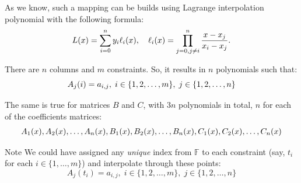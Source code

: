 \documentclass{zkdl-presentation-template}
\begin{document}
    \begin{frame}
        As we know, such a mapping can be builds using Lagrange interpolation polynomial with the
        following formula:
        \vspace{-10pt}
        \begin{equation*}
            L(x) = \sum_{i=0}^{n} y_i \ell_i(x), \quad \ell_i(x) = \prod_{j=0, j \neq i}^{n} \frac{x-x_j}{x_i-x_j}.
            \vspace{-10pt}
        \end{equation*}  

        \pause
        There are $n$ columns and $m$ constraints. So, it results in $n$ polynomials such that:
        \vspace{-10pt}
        \begin{equation*}
            A_j(i) = a_{i,j}, \; i \in \{1,2,\dots,m\}, \; j \in \{1,2,\dots,n\}
            \vspace{-10pt}
        \end{equation*}

        \pause
        The same is true for matrices $B$ and $C$, with $3n$ polynomials in total, $n$ for each of the
        coefficients matrices:
        \vspace{-8pt}
        \begin{align*}
            A_1(x), A_2(x), \dots, A_n(x), 
            B_1(x), B_2(x), \dots, B_n(x),
            C_1(x), C_2(x), \dots, C_n(x)
            \vspace{-10pt}
        \end{align*}

        \vspace{-10pt}
        \pause
        \begin{block}{Note}
            We could have assigned any \textit{unique} index from $\mathbb{F}$ to each constraint
            (say, $t_i$ for each $i \in \{1,\dots,m\}$) and interpolate through these points:
            \vspace{-8pt}
            \begin{equation*}
                A_j(t_i) = a_{i,j}, \; i \in \{1,2,\dots,m\}, \; j \in \{1,2,\dots,n\}
            \end{equation*}
        \end{block}
    \end{frame}
\end{document}

